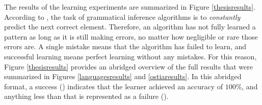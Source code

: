 The results of the learning experiments are summarized in Figure \ref{thesisresults}.
According to \cite{DeLaHiguera2010}, the task of grammatical inference algorithms is to \emph{constantly} predict the next correct element.
Therefore, an algorithm has not fully learned a pattern as long as it is still making errors, no matter how negligible or rare those errors are.
A single mistake means that the algorithm has failed to learn, and successful learning means perfect learning without any mistakes.
For this reason, Figure \ref{thesisresults} provides an abridged overview of the full results that were summarized in Figures \ref{languagesresults} and \ref{ostiaresults}.
In this abridged format, a success (\faThumbsOUp) indicates that the learner achieved an accuracy of $100\%$, and anything less than that is represented as a failure (\faTimes).

